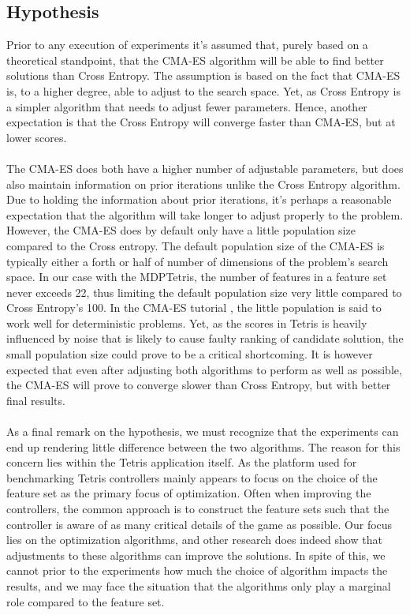 \subsection{Hypothesis}

Prior to any execution of experiments it's assumed that, purely based 
on a theoretical standpoint, that the CMA-ES algorithm will be able to 
find better solutions than Cross Entropy. The assumption is based 
on the fact that CMA-ES is, to a higher degree, able to adjust to the 
search space. Yet, as Cross Entropy is a simpler algorithm that needs 
to adjust fewer parameters. Hence, another expectation is that the 
Cross Entropy will converge faster than CMA-ES, but at lower scores.\\
\\
The CMA-ES does both have a higher number of adjustable parameters, but does also
maintain information on prior iterations unlike the Cross Entropy algorithm.
Due to holding the information about prior iterations, it's perhaps a reasonable
expectation that the algorithm will take longer to adjust properly to the
problem. However, the CMA-ES does by default only have a little population size 
compared to the Cross entropy. The default population size of the CMA-ES is
typically either a forth or half of number of dimensions of the problem's search space.
In our case with the MDPTetris, the number of features in a feature set never exceeds
22, thus limiting the default population size very little compared to Cross Entropy's 
100. In the CMA-ES tutorial \citep{hansen2011}, the little population is said to
work well for deterministic problems. Yet, as the scores in Tetris is heavily
influenced by noise that is likely to cause faulty ranking of candidate solution,
the small population size could prove to be a critical shortcoming.
It is however expected that even after adjusting both algorithms to perform as 
well as possible, the CMA-ES will prove to converge slower than Cross Entropy, but
with better final results.\\
\\
As a final remark on the hypothesis, we must recognize that the experiments can 
end up rendering little difference between the two algorithms. The reason for 
this concern lies within the Tetris application itself. As the platform used for benchmarking 
Tetris controllers mainly appears to focus on the choice of the feature set as the primary
focus of optimization. Often when improving the controllers, the common approach is to
construct the feature sets such that the controller is aware of as many critical 
details of the game as possible. Our focus lies on the optimization algorithms,
and other research does indeed show that adjustments to these algorithms can 
improve the solutions. In spite of this, we cannot prior to the experiments how much
the choice of algorithm impacts the results, and we may face the situation that 
the algorithms only play a marginal role compared to the feature set.
